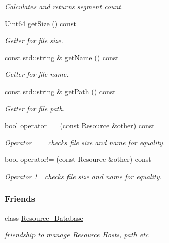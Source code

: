 \begin{DoxyCompactItemize}
\begin{DoxyCompactList}\small\item\em Calculates and returns segment count. \end{DoxyCompactList}\item 
Uint64 \hyperlink{classsimpleP2P_1_1Resource_adadeb491cccabbce2e1d883f9e8519f7}{get\+Size} () const
\begin{DoxyCompactList}\small\item\em Getter for file size. \end{DoxyCompactList}\item 
const std\+::string \& \hyperlink{classsimpleP2P_1_1Resource_adc12496aedf1729852d2c98bf94428aa}{get\+Name} () const
\begin{DoxyCompactList}\small\item\em Getter for file name. \end{DoxyCompactList}\item 
const std\+::string \& \hyperlink{classsimpleP2P_1_1Resource_a866cdd2e717abf3515629ca73b2f80b8}{get\+Path} () const
\begin{DoxyCompactList}\small\item\em Getter for file path. \end{DoxyCompactList}\item 
bool \hyperlink{classsimpleP2P_1_1Resource_a0b42735bed5ab425b9e26b660ededecf}{operator==} (const \hyperlink{classsimpleP2P_1_1Resource}{Resource} \&other) const
\begin{DoxyCompactList}\small\item\em Operator == checks file size and name for equality. \end{DoxyCompactList}\item 
bool \hyperlink{classsimpleP2P_1_1Resource_a5694c4c5a3d5b303a1fa0dcb3fb478b1}{operator!=} (const \hyperlink{classsimpleP2P_1_1Resource}{Resource} \&other) const
\begin{DoxyCompactList}\small\item\em Operator != checks file size and name for equality. \end{DoxyCompactList}\end{DoxyCompactItemize}
\subsubsection*{Friends}
\begin{DoxyCompactItemize}
\item 
\mbox{\label{classsimpleP2P_1_1Resource_a8d5b8c31f7b51293954816c91b76cabd}} 
class \hyperlink{classsimpleP2P_1_1Resource_a8d5b8c31f7b51293954816c91b76cabd}{Resource\+\_\+\+Database}
\begin{DoxyCompactList}\small\item\em friendship to manage \hyperlink{classsimpleP2P_1_1Resource}{Resource} Hosts, path etc \end{DoxyCompactList}\end{DoxyCompactItemize}


